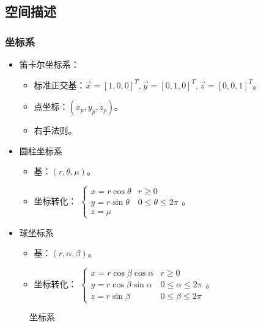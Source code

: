 \documentclass[
12pt, %
a4paper, 
oneside, %
headinclude,footinclude, %
]{scrartcl}
\begin{document}
\subsection{空间描述}
\subsubsection{坐标系}
\begin{itemize}
\item 笛卡尔坐标系：
\begin{itemize}
\item 标准正交基：$ \vec{x} = [1, 0, 0]^T, \vec{y} = [0, 1, 0]^T, \vec{z} = [0, 0, 1]^T $。
\item 点坐标：$ (x_p, y_p, z_p) $。
\item 右手法则。
\end{itemize}
\item 圆柱坐标系
\begin{itemize}
\item 基：$ (r, \theta, \mu) $。
\item 坐标转化：
$
\begin{cases}
x = r\cos\theta &r \geq 0 \\
y = r\sin\theta &0 \leq \theta \leq 2 \pi \\
z = \mu
\end{cases}
$。
\end{itemize}
\item 球坐标系
\begin{itemize}
\item 基：$ (r, \alpha, \beta) $。
\item 坐标转化：
$
\begin{cases}
x = r\cos\beta\cos\alpha &r \geq 0 \\
y = r\cos\beta\sin\alpha &0 \leq \alpha \leq 2\pi \\
z = r\sin\beta &0 \leq \beta \leq 2\pi
\end{cases}
$。
\end{itemize}
\end{itemize}

\begin{figure}[H]
\centering
{} \quad
{} \quad
{}
\caption[坐标系]{坐标系}
\end{figure}
\end{document}
